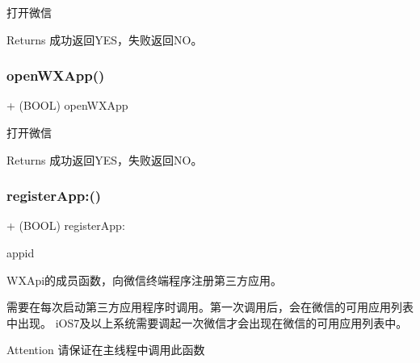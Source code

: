 打开微信 

\begin{DoxyReturn}{Returns}
成功返回\+Y\+E\+S，失败返回\+N\+O。 
\end{DoxyReturn}
\mbox{\label{interface_w_x_api_ac238ad8f1aa670ea9b26836f77701dc2}} 
\subsubsection{\texorpdfstring{open\+W\+X\+App()}{openWXApp()}\hspace{0.1cm}{\footnotesize\ttfamily [3/3]}}
{\footnotesize\ttfamily + (B\+O\+OL) open\+W\+X\+App \begin{DoxyParamCaption}{ }\end{DoxyParamCaption}}



打开微信 

\begin{DoxyReturn}{Returns}
成功返回\+Y\+E\+S，失败返回\+N\+O。 
\end{DoxyReturn}
\mbox{\label{interface_w_x_api_a84341d7a4aea16c2fd6e74708a569564}} 
\subsubsection{\texorpdfstring{register\+App\+:()}{registerApp:()}\hspace{0.1cm}{\footnotesize\ttfamily [1/3]}}
{\footnotesize\ttfamily + (B\+O\+OL) register\+App\+: \begin{DoxyParamCaption}\item[{(N\+S\+String $\ast$)}]{appid }\end{DoxyParamCaption}}



W\+X\+Api的成员函数，向微信终端程序注册第三方应用。 

需要在每次启动第三方应用程序时调用。第一次调用后，会在微信的可用应用列表中出现。 i\+O\+S7及以上系统需要调起一次微信才会出现在微信的可用应用列表中。 \begin{DoxyAttention}{Attention}
请保证在主线程中调用此函数 
\end{DoxyAttention}

